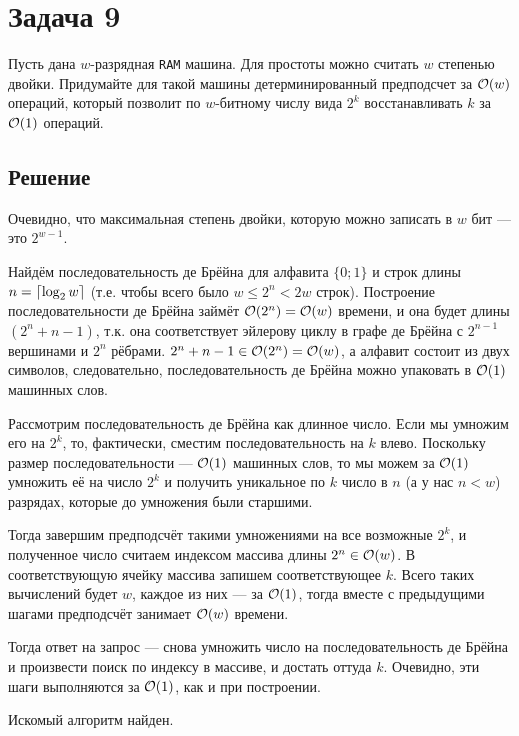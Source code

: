 \section{Задача 9}
Пусть дана $w$-разрядная \texttt{RAM} машина. Для простоты можно считать
$w$ степенью двойки. Придумайте для такой машины детерминированный предподсчет за $\mathcal{O}(w)$ операций, который позволит по $w$-битному числу вида $2^k$ восстанавливать $k$ за $\mathcal{O}(1)$ операций.

\subsection{Решение}
Очевидно, что максимальная степень двойки,
которую можно записать в $w$ бит --- это $2^{w - 1}$.

Найдём последовательность де Брёйна для алфавита $\{0; 1\}$
и строк длины $n = \left \lceil \log_2 w \right \rceil$ (т.е. чтобы всего было $w \leq 2^n < 2w$ строк).
Построение последовательности де Брёйна займёт $\mathcal{O}(2^n) = \mathcal{O}(w)$ времени,
и она будет длины $(2^n + n - 1)$, т.к. она соответствует эйлерову
циклу в графе де Брёйна с $2^{n - 1}$ вершинами и $2^n$ рёбрами.
$2^n + n - 1 \in \mathcal{O}(2^n) = \mathcal{O}(w)$, а алфавит состоит из двух символов,
следовательно, последовательность де Брёйна можно упаковать в $\mathcal{O}(1)$ машинных слов.

Рассмотрим последовательность де Брёйна как длинное число.
Если мы умножим его на $2^k$, то, фактически, сместим последовательность на $k$ влево.
Поскольку размер последовательности --- $\mathcal{O}(1)$ машинных слов,
то мы можем за $\mathcal{O}(1)$ умножить её на число $2^k$ и получить уникальное по $k$
число в $n$ (а у нас $n < w$) разрядах, которые до умножения были старшими.

Тогда завершим предподсчёт такими умножениями на все возможные $2^k$,
и полученное число считаем индексом массива длины $2^n \in \mathcal{O}(w)$.
В соответствующую ячейку массива запишем соответствующее $k$.
Всего таких вычислений будет $w$, каждое из них --- за $\mathcal{O}(1)$,
тогда вместе с предыдущими шагами предподсчёт занимает $\mathcal{O}(w)$ времени.

Тогда ответ на запрос --- снова умножить число на последовательность де Брёйна
и произвести поиск по индексу в массиве, и достать оттуда $k$.
Очевидно, эти шаги выполняются за $\mathcal{O}(1)$, как и при построении.

Искомый алгоритм найден.
